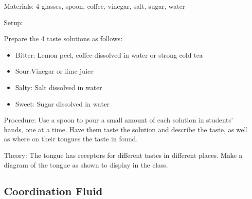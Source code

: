 \begin{multicols}{2}
\begin{description*}
\item[Materials:]{4 glasses, spoon, coffee, vinegar, salt, sugar, water}
\item[Setup:]{Prepare the 4 taste solutions as follows:
\begin{itemize}
\item Bitter: Lemon peel, coffee dissolved in water or strong cold tea
\item Sour:Vinegar or lime juice
\item Salty: Salt dissolved in water
\item Sweet: Sugar dissolved in water
\end{itemize}}
\item[Procedure:]{Use a spoon to pour a small amount of each solution in students' hands, one at a time. Have them taste the solution and describe the taste, as well as where on their tongues the taste in found.}
\item[Theory:]{The tongue has receptors for different tastes in different places. Make a diagram of the tongue as shown to display in the class.}
\end{description*}

\subsection{Coordination Fluid}



\end{multicols}
